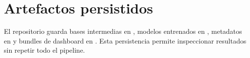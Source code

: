 \section{Artefactos persistidos}

El repositorio guarda bases intermedias en , modelos entrenados en , metadatos en  y bundles de dashboard en . Esta persistencia permite inspeccionar resultados sin repetir todo el pipeline.
